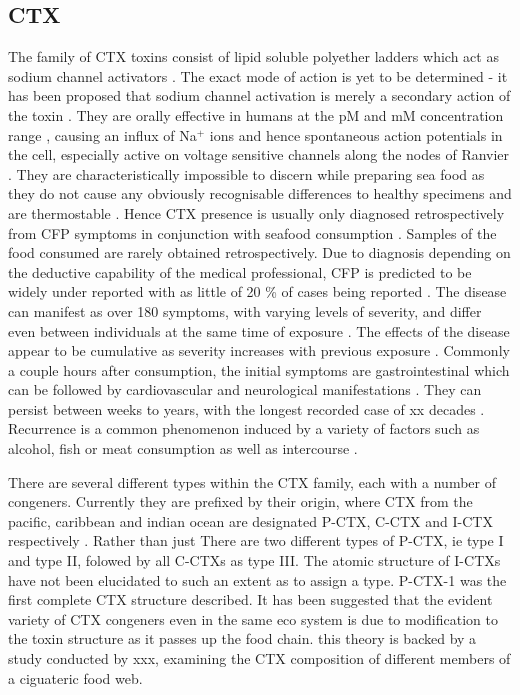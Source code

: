 \documentclass[12pt]{article}
\begin{document}
\subsection{CTX}
The family of CTX toxins consist of lipid soluble polyether ladders which act as sodium channel activators \cite{}. The exact mode of action is yet to be determined - it has been proposed that sodium channel activation is merely a secondary action of the toxin \cite{}. They are orally effective in humans at the pM and mM concentration range \cite{molgo2000ciguatera}, causing an influx of Na$^{+}$ ions and hence spontaneous action potentials in the cell, especially active on voltage sensitive channels along the nodes of Ranvier \cite{sims1987theoretical,mattei1999neurotoxins,lewis1992action,molgo2000ciguatera}. They are characteristically impossible to discern while preparing sea food as they do not cause any obviously recognisable differences to healthy specimens and are thermostable \cite{withers1982ciguatera}. Hence CTX presence is usually only diagnosed retrospectively from CFP symptoms in conjunction with seafood consumption \cite{}. Samples of the food consumed are rarely obtained retrospectively. Due to diagnosis depending on the deductive capability of the medical professional, CFP is predicted to be widely under reported with as little of 20 \% of cases being reported \cite{}. The disease can manifest as over 180 symptoms, with varying levels of severity, and differ even between individuals at the same time of exposure \cite{}. The effects of the disease appear to be cumulative as severity increases with previous exposure \cite{}. Commonly a couple hours after consumption, the initial symptoms are gastrointestinal which can be followed by cardiovascular and neurological manifestations \cite{sims1987theoretical}. They can persist between weeks to years, with the longest recorded case of xx decades \cite{}. Recurrence is a common phenomenon induced by a variety of factors such as alcohol, fish or meat consumption as well as intercourse \cite{}. 

There are several different types within the CTX family, each with a number of congeners. Currently they are prefixed by their origin, where CTX from the pacific, caribbean and indian ocean are designated P-CTX, C-CTX and I-CTX respectively \cite{}. Rather than just 
There are two different types of P-CTX, ie type I and type II, folowed by all C-CTXs as type III. The atomic structure of I-CTXs have not been elucidated to such an extent as to assign a type.  
P-CTX-1 was the first complete CTX structure described.
It has been suggested that the evident variety of CTX congeners even in the same eco system is due to modification to the toxin structure as it passes up the food chain. this theory is backed by a study conducted by xxx, examining the CTX composition of different members of a ciguateric food web.
\end{document}
